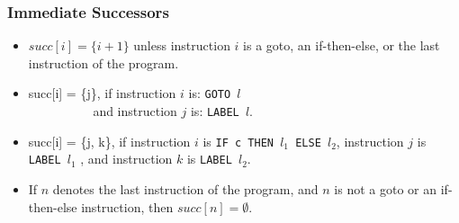 \documentclass{beamer}
\newcommand{\emp}[1]{\textcolor{DikuRed}{ #1}}
\begin{document}
\begin{frame}[fragile,t]
   \frametitle{Immediate Successors}

\bigskip
\bigskip

\begin{itemize}

    \item \emp{$succ[i] = \{i+1\}$} unless instruction $i$ is a {\sc goto}, an
            {\sc if-then-else}, or the last instruction of the program.\bigskip


    \item \emp{succ[i] = \{j\}}, if instruction $i$ is: {\tt GOTO $l$}\\
            {\tt~~~~~~~~~~}and instruction $j$ is: {\tt LABEL $l$}.\bigskip


    \item \emp{succ[i] = \{j, k\}}, if instruction $i$ is {\tt IF c THEN $l_1$ ELSE $l_2$},
            instruction $j$ is {\tt LABEL $l_1$} , and instruction $k$ is {\tt LABEL $l_2$}.\bigskip


    \item If $n$ denotes the last instruction of the program, and $n$ is not a
                {\sc goto} or an {\sc if-then-else} instruction, then \emp{$succ[n] = \emptyset$}.

\end{itemize}

\end{frame}
\end{document}
